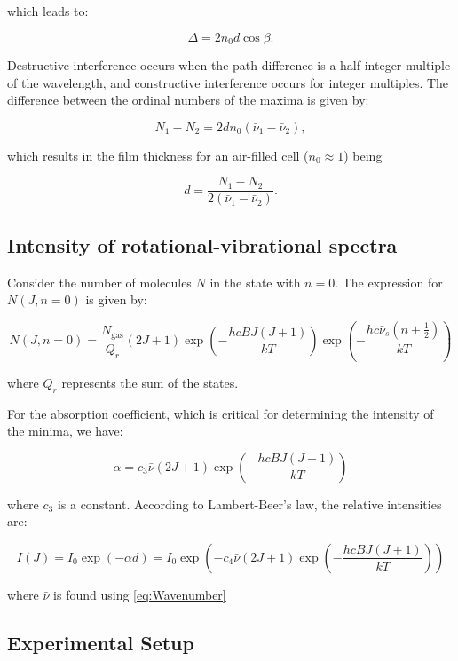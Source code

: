 \documentclass{article}
\begin{document}
which leads to:

\[
\Delta = 2n_0 d \cos \beta.
\]

Destructive interference occurs when the path difference is a half-integer multiple of the wavelength, and constructive interference occurs for integer multiples. The difference between the ordinal numbers of the maxima is given by:

\[
N_1 - N_2 = 2dn_0 (\bar{\nu}_1 - \bar{\nu}_2),
\]

which results in the film thickness for an air-filled cell (\(n_0 \approx 1\)) being

\begin{equation}
	d = \frac{N_1 - N_2}{2(\bar{\nu}_1 - \bar{\nu}_2)}.
	\label{eq:thickness}
\end{equation}

\pagebreak{}

\subsection{Intensity of rotational-vibrational spectra}

Consider the number of molecules \( N \) in the state with \( n = 0 \). The expression for \( N(J, n = 0) \) is given by:

\[
N(J, n = 0) = \frac{N_{\text{gas}}}{Q_r}(2J + 1) \exp \left( - \frac{hcBJ(J+1)}{kT} \right) \exp \left( - \frac{hc \bar{\nu}_s (n + \frac{1}{2})}{kT} \right) 
\]

where \( Q_r \) represents the sum of the states. 

For the absorption coefficient, which is critical for determining the intensity of the minima, we have:

\[
\alpha = c_3 \bar{\nu} (2J + 1) \exp \left( - \frac{hcB J (J + 1)}{kT} \right)
\]

where \( c_3 \) is a constant. According to Lambert-Beer's law, the relative intensities are:

\begin{equation}
I(J) = I_0 \exp \left( -\alpha d \right) = I_0 \exp \left( -c_4 \bar{\nu} (2J + 1) \exp \left( - \frac{hcB J (J + 1)}{kT} \right) \right)
\label{eq:Lambert-Beer}
\end{equation}

where \( \bar{\nu} \) is found using \ref{eq:Wavenumber}

\pagebreak{}

\subsection{Experimental Setup}
\end{document}
